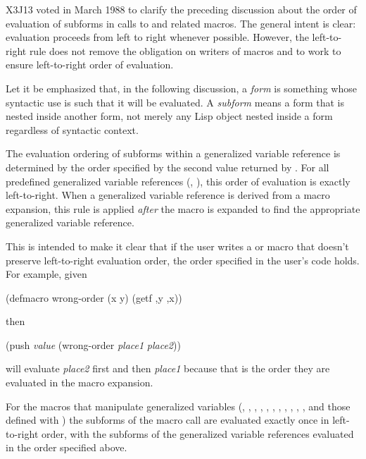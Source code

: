 \begin{newer}
X3J13 voted in March 1988 
to clarify the preceding discussion about the order of evaluation of
subforms in calls to  and related macros.
The general intent is clear: evaluation
proceeds from left to right whenever possible. However, the left-to-right rule does not
remove the obligation on writers of macros and  to work
to ensure left-to-right order of evaluation.

Let it be emphasized that, in the following discussion,
a \textit{form} is something whose syntactic use is such that it will
be evaluated.  A \textit{subform} means a form that is nested inside another form,
not merely any Lisp object nested inside a form regardless of syntactic context. 

The evaluation ordering of subforms within a generalized variable
reference is determined by the order specified by the second value returned by
.  For all predefined generalized variable references
(, ), this order of evaluation is exactly left-to-right.
When a generalized
variable reference is derived from a macro expansion, this rule is applied
\textit{after} the macro is expanded to find the appropriate generalized variable
reference. 

This is intended to make it clear that if the user writes a  or
 macro that doesn't preserve left-to-right
evaluation order, the order specified in the
user's code holds.  For example, given
\begin{lisp}
(defmacro wrong-order (x y) {\Xbq}(getf ,y ,x))
\end{lisp}
then
\begin{lisp}
(push \textit{value} (wrong-order \textit{place1} \textit{place2}))
\end{lisp}
will evaluate \textit{place2} first and then \textit{place1} because that is the order they
are evaluated in the macro expansion.
 
For the macros that manipulate generalized variables (, , ,
, , , , ,
, , , and those defined with
) the subforms of the macro call are evaluated exactly once
in left-to-right order, with the subforms of the generalized variable
references evaluated in the order specified above.


\end{newer}
